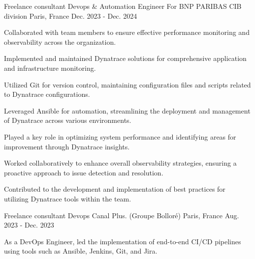 

\begin{cventries}

  \cventry
    {Freelance consultant Devops & Automation Engineer} %
    {For BNP PARIBAS CIB division} %
    {Paris, France} %
    {Dec. 2023 - Dec. 2024} %
    {
      \begin{cvitems} %
        \item {Collaborated with team members to ensure effective performance monitoring and observability across the organization.}
        \item {Implemented and maintained Dynatrace solutions for comprehensive application and infrastructure monitoring.}
        \item {Utilized Git for version control, maintaining configuration files and scripts related to Dynatrace configurations.}
        \item {Leveraged Ansible for automation, streamlining the deployment and management of Dynatrace across various environments.}
        \item {Played a key role in optimizing system performance and identifying areas for improvement through Dynatrace insights.}
        \item {Worked collaboratively to enhance overall observability strategies, ensuring a proactive approach to issue detection and resolution.}
        \item {Contributed to the development and implementation of best practices for utilizing Dynatrace tools within the team.}
      \end{cvitems}
    }
  \cventry
    {Freelance consultant Devops} %
    {Canal Plus. (Groupe Bolloré)} %
    {Paris, France} %
    {Aug. 2023 - Dec. 2023} %
    {
      \begin{cvitems} %
        \item {As a DevOps Engineer, led the implementation of end-to-end CI/CD pipelines using tools such as Ansible, Jenkins, Git, and Jira.}

\end{cvitems}}
\end{cventries}

